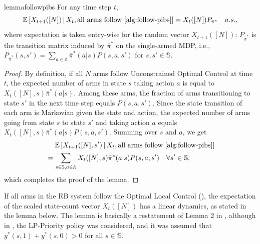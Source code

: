 \documentclass[11pt,letterpaper]{article}
\theoremstyle{plain}
\theoremstyle{definition}
\theoremstyle{remark}
\newcommand{\E}[1]{\mathbb{E}\left[#1\right]}
\newcommand{\givenplain}{\,|\,}
\newcommand{\sspa}{\mathbb{S}}
\newcommand{\aspa}{\mathbb{A}}
\newcommand{\sumsa}{\sum_{s\in\sspa, a\in\aspa}}
\newcommand{\pibar}{{\sysbar{\pi}}}
\newcommand{\pibs}{{\pibar^*}}
\newcommand{\sysbar}[1]{\bar{#1}}
\begin{document}
\begin{restatable}{lemma}{followpibs}\label{lem:pibs-transition}
    For any time step $t$, 
    \begin{equation}
        \E{X_{t+1}([N]) \givenplain X_t, \textup{all arms follow \Cref{alg:follow-pibs}}} = X_t([N]) P_{\pibs} \quad a.s., 
    \end{equation}
    where expectation is taken entry-wise for the random vector $X_{t+1}([N])$; $P_{\pibs}$ is the transition matrix induced by $\pibs$ on the single-armed MDP, i.e., $P_{\pibs}(s,s') = \sum_{a\in\aspa} \pibs(a|s) P(s,a,s')$ for $s,s'\in\sspa$.  
\end{restatable}


\begin{proof}%
    By definition, if all $N$ arms follow Unconstrained Optimal Control at time $t$, the expected number of arms in state $s$ taking action $a$ is equal to $X_t([N], s)\pibs(a|s)$. Among these arms, the fraction of arms transitioning to state $s'$ in the next time step equals $P(s,a,s')$. Since the state transition of each arm is Markovian given the state and action, the expected number of arms going from state $s$ to state $s'$ and taking action $a$ equals $X_t([N], s)\pibs(a|s)P(s,a,s')$. Summing over $s$ and $a$, we get 
    \begin{align*}
        &\mspace{23mu} \E{X_{t+1}([N], s') \givenplain X_t, \textup{all arms follow \Cref{alg:follow-pibs}}} \\
        &= \sumsa X_t([N], s)\pibs(a|s)P(s,a,s') \quad \forall s'\in\sspa,    
    \end{align*}
    which completes the proof of the lemma.  
\end{proof}





If all arms in the RB system follow the Optimal Local Control (), the expectation of the scaled state-count vector $X_t([N])$ has a linear dynamics, as stated in the lemma below. The lemma is basically a restatement of Lemma 2 in \cite{GasGauYan_23_whittles}, although in \cite{GasGauYan_23_whittles}, the LP-Priority policy was considered, and it was assumed that $y^*(s,1) + y^*(s,0) > 0$ for all $s\in\sspa$. 


\followlppriority*
\end{document}
